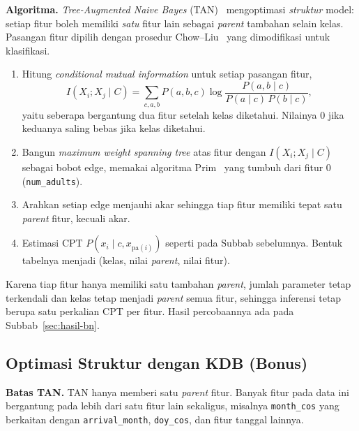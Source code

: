 \textbf{Algoritma.} \textit{Tree-Augmented Naive Bayes} (TAN)~\cite{friedman1997bnc}
mengoptimasi \textit{struktur} model: setiap fitur boleh memiliki \textit{satu}
fitur lain sebagai \textit{parent} tambahan selain kelas. Pasangan fitur dipilih
dengan prosedur Chow--Liu~\cite{chow1968trees} yang dimodifikasi untuk klasifikasi.
\begin{enumerate}
	\item Hitung \textit{conditional mutual information} untuk setiap pasangan fitur,
	\begin{equation}
		I(X_i;X_j\mid C)=\sum_{c,a,b}P(a,b,c)\log\frac{P(a,b\mid c)}{P(a\mid c)\,P(b\mid c)} ,
	\end{equation}
	yaitu seberapa bergantung dua fitur setelah kelas diketahui. Nilainya 0 jika
	keduanya saling bebas jika kelas diketahui.
	\item Bangun \textit{maximum weight spanning tree} atas fitur dengan
	$I(X_i;X_j\mid C)$ sebagai bobot edge, memakai algoritma Prim~\cite{prim1957shortest}
	yang tumbuh dari fitur 0 (\texttt{num\_adults}).
	\item Arahkan setiap edge menjauhi akar sehingga tiap fitur memiliki tepat satu
	\textit{parent} fitur, kecuali akar.
	\item Estimasi CPT $P(x_i\mid c,x_{\mathrm{pa}(i)})$ seperti pada
	Subbab sebelumnya. Bentuk tabelnya menjadi (kelas, nilai \textit{parent}, nilai
	fitur).
\end{enumerate}
Karena tiap fitur hanya memiliki satu tambahan \textit{parent}, jumlah parameter
tetap terkendali dan kelas tetap menjadi \textit{parent} semua fitur, sehingga
inferensi tetap berupa satu perkalian CPT per fitur. Hasil percobaannya ada pada
Subbab~\ref{sec:hasil-bn}.



\subsection{Optimasi Struktur dengan KDB (Bonus)}
\label{sec:kdb}

\textbf{Batas TAN.} TAN hanya memberi satu \textit{parent} fitur. Banyak fitur pada
data ini bergantung pada lebih dari satu fitur lain sekaligus, misalnya
\texttt{month\_cos} yang berkaitan dengan \texttt{arrival\_month},
\texttt{doy\_cos}, dan fitur tanggal lainnya.

